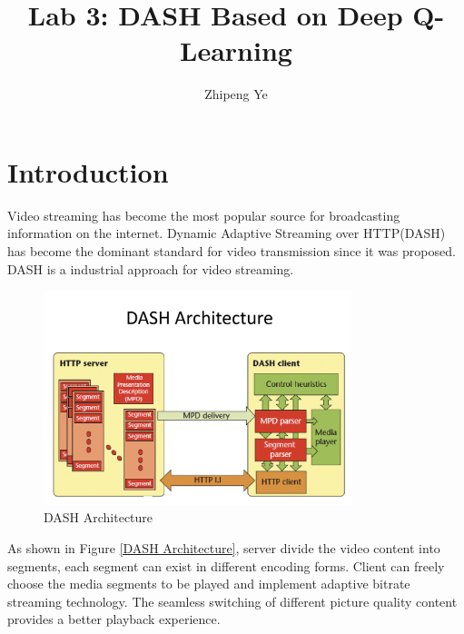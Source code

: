 \documentclass[11pt]{article}
\title{Lab 3: DASH Based on Deep Q-Learning}
\author{Zhipeng Ye}
\affil{Department of Electrical and Electronic Engineering \\Xi’an Jiaotong-Liverpool University}
\begin{document}
\maketitle

\section{Introduction}
Video streaming has become the most popular source for broadcasting information on the internet. Dynamic Adaptive Streaming over HTTP(DASH) has become the dominant standard for video transmission since it was proposed.
DASH is a industrial approach for video streaming.

\begin{figure}[htbp]
    \centering
        \includegraphics[width= 0.8\textwidth]{DASH.png}
    \caption{DASH Architecture}
    \label{DASH Architecture}
\end{figure}

As shown in Figure \ref{DASH  Architecture}, server divide the video content into segments, each segment can exist in different encoding forms.
Client can freely choose the media segments to be played and implement adaptive bitrate streaming technology. The seamless switching of different picture quality content provides a better playback experience.
\end{document}
